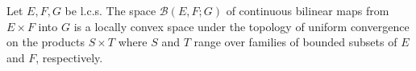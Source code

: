 Let $E, F, G$ be l.c.s. The space $\mathcal{B}(E, F; G)$ of continuous bilinear maps from $E \times F$ into $G$ is a locally convex space under the topology of uniform convergence on the products $S \times T$ where $S$ and $T$ range over families of bounded subsets of $E$ and $F$, respectively.
